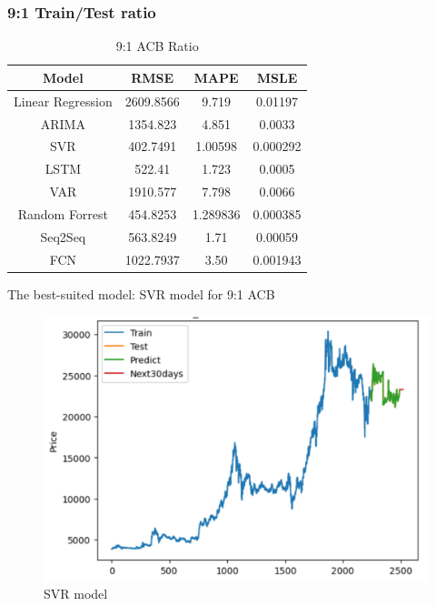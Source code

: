 \documentclass{ieeeojies}
\begin{document}
\subsubsection{9:1 Train/Test ratio}
\label{subsec:9:1 VCB}
\begin{table}[H]
    \centering
    \begin{tabular}{|c|c|c|c|}
    \hline
    Model & \textbf{RMSE} & \textbf{MAPE} & \textbf{MSLE} \\
    \hline
    Linear Regression & 2609.8566 & 9.719 & 0.01197 \\
    \hline
    ARIMA & 1354.823 & 4.851 & 0.0033 \\
    \hline
    \rowcolor{red!10}
    SVR & 402.7491 & 1.00598 & 0.000292 \\
    \hline
    LSTM & 522.41 & 1.723 & 0.0005 \\
    \hline
    VAR & 1910.577 & 7.798 & 0.0066 \\
    \hline
    Random Forrest & 454.8253 & 1.289836 & 0.000385 \\
    \hline
    Seq2Seq & 563.8249 & 1.71 & 0.00059 \\
    \hline
    FCN & 1022.7937 & 3.50 & 0.001943 \\
    \hline
    \end{tabular}
    \caption{9:1 ACB Ratio}
    \label{tab:9:1 VCB}
\end{table}
The best-suited model: SVR model for 9:1 ACB

\begin{figure}[H]
    \centering
    \includegraphics[width=1\linewidth]{acb_svr_91.png}
    \caption{SVR model}
    \label{fig:enter-label}
\end{figure}
\end{document}
